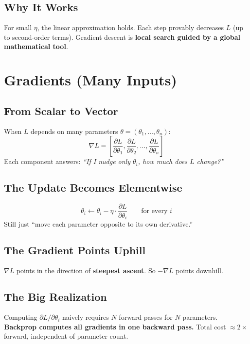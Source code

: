 \documentclass[11pt,a4paper]{book}
\begin{document}
\section{Why It Works}

For small $\eta$, the linear approximation holds. Each step provably decreases $L$ (up to second-order terms). Gradient descent is \textbf{local search guided by a global mathematical tool}.

\chapter{Gradients (Many Inputs)}\label{ch:gradients}

\section{From Scalar to Vector}

When $L$ depends on many parameters $\theta = (\theta_1, \ldots, \theta_n)$:
\begin{equation}
    \nabla L = \left[\frac{\partial L}{\partial \theta_1}, \frac{\partial L}{\partial \theta_2}, \ldots, \frac{\partial L}{\partial \theta_n}\right]
\end{equation}
Each component answers: \textit{``If I nudge only $\theta_i$, how much does $L$ change?''}

\section{The Update Becomes Elementwise}

\begin{equation}
    \theta_i \leftarrow \theta_i - \eta \cdot \frac{\partial L}{\partial \theta_i} \qquad \text{for every } i
\end{equation}
Still just ``move each parameter opposite to its own derivative.''

\section{The Gradient Points Uphill}

$\nabla L$ points in the direction of \textbf{steepest ascent}. So $-\nabla L$ points downhill.

\section{The Big Realization}

Computing $\partial L/\partial\theta_i$ naively requires $N$ forward passes for $N$ parameters.
\textbf{Backprop computes all gradients in one backward pass.} Total cost $\approx 2\times$ forward, independent of parameter count.
\end{document}
